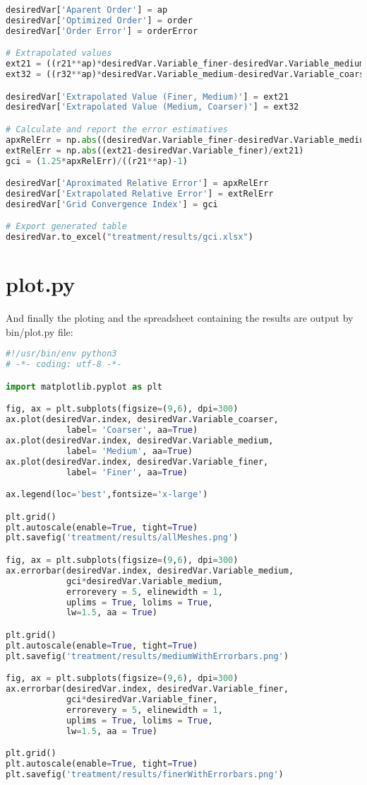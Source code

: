 \begin{lstlisting}[language=python]
desiredVar['Aparent Order'] = ap
desiredVar['Optimized Order'] = order
desiredVar['Order Error'] = orderError

# Extrapolated values
ext21 = ((r21**ap)*desiredVar.Variable_finer-desiredVar.Variable_medium)/((r21**ap)-1)
ext32 = ((r32**ap)*desiredVar.Variable_medium-desiredVar.Variable_coarser)/((r32**ap)-1)

desiredVar['Extrapolated Value (Finer, Medium)'] = ext21
desiredVar['Extrapolated Value (Medium, Coarser)'] = ext32

# Calculate and report the error estimatives
apxRelErr = np.abs((desiredVar.Variable_finer-desiredVar.Variable_medium)/desiredVar.Variable_finer)
extRelErr = np.abs((ext21-desiredVar.Variable_finer)/ext21)
gci = (1.25*apxRelErr)/((r21**ap)-1)

desiredVar['Aproximated Relative Error'] = apxRelErr
desiredVar['Extrapolated Relative Error'] = extRelErr
desiredVar['Grid Convergence Index'] = gci

# Export generated table
desiredVar.to_excel("treatment/results/gci.xlsx")  
\end{lstlisting}
\section{plot.py}
And finally the ploting and the spreadsheet containing the results are output by bin/plot.py file: 
\begin{lstlisting}[language=python]
#!/usr/bin/env python3
# -*- coding: utf-8 -*-

import matplotlib.pyplot as plt

fig, ax = plt.subplots(figsize=(9,6), dpi=300)
ax.plot(desiredVar.index, desiredVar.Variable_coarser,
            label= 'Coarser', aa=True)
ax.plot(desiredVar.index, desiredVar.Variable_medium,
            label= 'Medium', aa=True)
ax.plot(desiredVar.index, desiredVar.Variable_finer,
            label= 'Finer', aa=True)

ax.legend(loc='best',fontsize='x-large')

plt.grid()
plt.autoscale(enable=True, tight=True)
plt.savefig('treatment/results/allMeshes.png')

fig, ax = plt.subplots(figsize=(9,6), dpi=300)
ax.errorbar(desiredVar.index, desiredVar.Variable_medium,
            gci*desiredVar.Variable_medium,
            errorevery = 5, elinewidth = 1,
            uplims = True, lolims = True, 
            lw=1.5, aa = True)

plt.grid()
plt.autoscale(enable=True, tight=True)
plt.savefig('treatment/results/mediumWithErrorbars.png')

fig, ax = plt.subplots(figsize=(9,6), dpi=300)
ax.errorbar(desiredVar.index, desiredVar.Variable_finer,
            gci*desiredVar.Variable_finer,
            errorevery = 5, elinewidth = 1,
            uplims = True, lolims = True, 
            lw=1.5, aa = True)

plt.grid()
plt.autoscale(enable=True, tight=True)
plt.savefig('treatment/results/finerWithErrorbars.png')
\end{lstlisting}